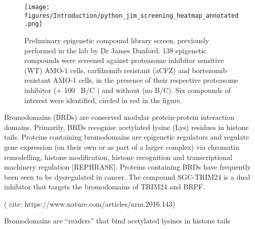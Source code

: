 \begin{figure}[hp]
\centering\texttt{[image: figures/Introduction/python\_jim\_screening\_heatmap\_annotated.png]}
\caption[Epigenentic compound library screen]{Preliminary epigenetic compound library screen, previously performed in the lab by Dr James Dunford.
138 epigenetic compounds were screened against proteasome inhibitor sensitive (WT) AMO-1 cells, carfilzomib resistant (aCFZ) and bortezomib resistant AMO-1 cells, in the presence of their respective proteasome inhibitor (+ 100\si{\nano\Molar} B/C ) and without (no B/C).
Six compounds of interest were identified, circled in red in the figure.}
\label{fig:compound_screen}
\end{figure}



Bromodomains (BRDs) are conserved modular protein-protein interaction domains.
Primarily, BRDs recognise acetylated lysine (Lys) residues in histone tails.
Proteins containing bromodomains are epigenetic regulators and regulate gene expression (on their own or as part of a larger complex) via chromatin remodelling, histone modification, histone recognition and transcriptional machinery regulation [REPHRASE].
Proteins containing BRDs have frequently been seen to be dysregulated in cancer.
The compound SGC-TRIM24 is a dual inhibitor that targets the bromodomains of TRIM24 and BRPF.


( cite: https://www.nature.com/articles/nrm.2016.143)


Bromodomains are ``readers'' that bind acetylated lysines in histone tails
